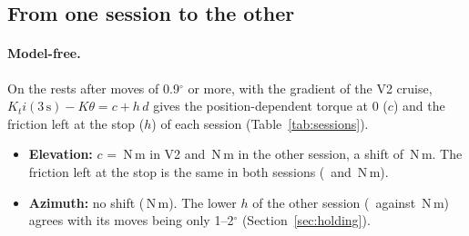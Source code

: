 \documentclass[10pt,a4paper]{article}
\numberwithin{equation}{section}
\begin{document}
\subsection{From one session to the other}\label{sec:sessions}
\paragraph{Model-free.} On the rests after moves of 0.9$^\circ$ or more, with the gradient of the V2 cruise, $K_ti(3\,\mathrm s)-K\theta=c+h\,d$ gives the position-dependent torque at 0 ($c$) and the friction left at the stop ($h$) of each session (Table~\ref{tab:sessions}).
\begin{itemize}
\item \textbf{Elevation:} $c$ = \cSesVtwoEl\,N\,m in V2 and \cSesOtherEl\,N\,m in the other session, a shift of \cSesShiftEl\,N\,m. The friction left at the stop is the same in both sessions (\hSesVtwoEl\ and \hSesOtherEl\,N\,m).
\item \textbf{Azimuth:} no shift (\cSesShiftAz\,N\,m). The lower $h$ of the other session (\hSesOtherAz\ against \hSesVtwoAz\,N\,m) agrees with its moves being only 1--2$^\circ$ (Section~\ref{sec:holding}).
\end{itemize}
\end{document}
